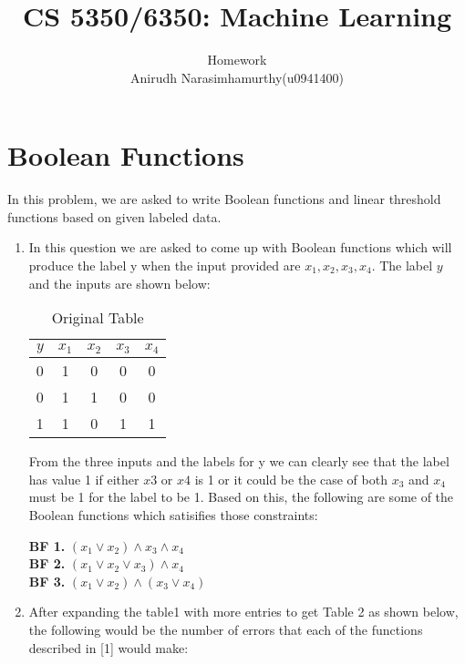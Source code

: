 \documentclass[12pt, fullpage,letterpaper]{article}
\title{CS 5350/6350: Machine Learning \semester}
\author{Homework \assignmentId   \\           
	 Anirudh Narasimhamurthy(u0941400)}
\begin{document}
\maketitle

\section{Boolean Functions}
\label{sec:bool_func}

In this problem, we are asked to write Boolean functions and
linear threshold functions based on given labeled data.

\begin{enumerate}
	
	\item In this question we are asked to come up with Boolean functions which will produce the label y when the input provided are $x_1,x_2,x_3,x_4$. The label $y$ and the inputs are shown below:
	
	\begin{table}[h]
		\centering
		\begin{tabular}{|c|cccc|}
			\hline
			$y$  & $x_1$ & $x_2$  & $x_3$  & $x_4$  \\
			\hline
			0  &  1    &  0     &  0     &  0     \\
			0  &  1    &  1     &  0     &  0     \\
			1  &  1    &  0     &  1     &  1     \\
			\hline
		\end{tabular}
		\caption{Original Table}
		\label{t1}
	\end{table}

From the three inputs and the labels for y we can clearly see that the label has value 1 if either $x3$ or $x4$ is 1 or it could be the case of both $x_3$ and $x_4$ must be 1 for the label to be 1. Based on this, the following are some of the Boolean functions which satisifies those constraints:

\textbf{BF 1.} $(x_1 \vee x_2) \land x_3 \land x_4 $\\
\textbf{BF 2.} $(x_1 \vee x_2 \vee x_3) \land x_4 $\\
\textbf{BF 3.} $(x_1 \vee x_2) \land (x_3 \vee x_4) $\\


\item After expanding the table1 with more entries to get Table 2 as shown below, the following would be the number of errors that each of the functions described in [1] would make: 


\end{enumerate}
\end{document}
